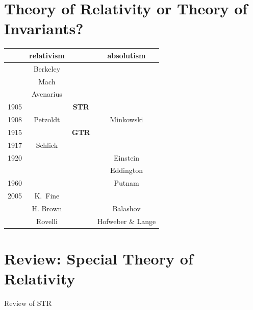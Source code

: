 \documentclass[fleqn]{beamer}
\begin{document}
\section{Theory of Relativity or Theory of Invariants?}


\begin{frame}

\begin{tabular}{l c c c}
  & relativism & & absolutism \\ \hline
  & Berkeley & & \\
  & Mach & & \\
  & Avenarius & & \\
  1905 & & \textbf{STR}  \\
  1908 & Petzoldt & & Minkowski \\
  1915 &          & \textbf{GTR} & \\
  1917 & Schlick  & & \\
  1920 &          & & Einstein \\
       &          & & Eddington \\
  1960 &          & & Putnam \\
  2005 & K.\ Fine & &   \\
       & H. Brown & & Balashov      \\
       & Rovelli  & & Hofweber \& Lange \end{tabular}


\end{frame}





\section{Review: Special Theory of Relativity}

  
\begin{frame}{Review of STR}

 \begin{center}
\end{center}


 
\end{frame}
\end{document}
